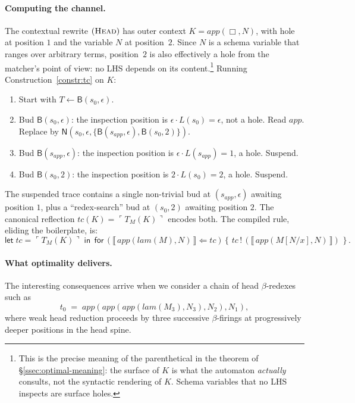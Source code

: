 \documentclass[11pt]{article}
\theoremstyle{plain}
\theoremstyle{definition}
\theoremstyle{remark}
\newcommand{\sem}[1]{\llbracket\,#1\,\rrbracket}
\newcommand{\reflect}[1]{\ulcorner #1 \urcorner}
\newcommand{\Send}[2]{#1 \,!\, (#2)}
\newcommand{\Recv}[3]{\mathsf{for}\,(#1 \Leftarrow #2)\,\{\,#3\,\}}
\newcommand{\Let}[3]{\mathsf{let}\;#1 = #2\;\mathsf{in}\;#3}
\begin{document}
\paragraph{Computing the channel.}
The contextual rewrite $(\textsc{Head})$ has outer context
$K = \mathit{app}(\Box, N)$, with hole at position $1$ and the variable
$N$ at position~$2$. Since $N$ is a schema variable that ranges over
arbitrary terms, position~$2$ is also effectively a hole from the
matcher's point of view: no LHS depends on its content.\footnote{This
is the precise meaning of the parenthetical in the theorem of
\S\ref{ssec:optimal-meaning}: the surface of $K$ is what the automaton
\emph{actually} consults, not the syntactic rendering of $K$. Schema
variables that no LHS inspects are surface holes.}
Running Construction~\ref{constr:tc} on $K$:
\begin{enumerate}[leftmargin=2em,label=\arabic*.]
  \item Start with $T \gets \mathsf{B}(s_{0}, \epsilon)$.
  \item Bud $\mathsf{B}(s_{0}, \epsilon)$: the inspection position is
        $\epsilon \cdot L(s_{0}) = \epsilon$, not a hole. Read
        $\mathit{app}$. Replace by
        $\mathsf{N}(s_{0}, \epsilon, \{\mathsf{B}(s_{\mathit{app}},
        \epsilon), \mathsf{B}(s_{0}, 2)\})$.
  \item Bud $\mathsf{B}(s_{\mathit{app}}, \epsilon)$: the inspection
        position is $\epsilon \cdot L(s_{\mathit{app}}) = 1$, a hole.
        Suspend.
  \item Bud $\mathsf{B}(s_{0}, 2)$: the inspection position is $2 \cdot
        L(s_{0}) = 2$, a hole. Suspend.
\end{enumerate}
The suspended trace contains a single non-trivial bud at
$(s_{\mathit{app}}, \epsilon)$ awaiting position $1$, plus a
``redex-search'' bud at $(s_{0}, 2)$ awaiting position $2$. The
canonical reflection $tc(K) = \reflect{T_{M}(K)}$ encodes both. The
compiled rule, eliding the boilerplate, is:
\[
  \Let{tc}{\reflect{T_{M}(K)}}{\,
    \Recv{\sem{\mathit{app}(\mathit{lam}(M), N)}}{tc}{\,
      \Send{tc}{\sem{\mathit{app}(M[N/x], N)}}\,}
  \,}.
\]

\paragraph{What optimality delivers.}
The interesting consequences arrive when we consider a chain of head
$\beta$-redexes such as
\[
  t_{0} \;=\; \mathit{app}(\mathit{app}(\mathit{app}(\mathit{lam}(M_{3}),
              N_{3}), N_{2}), N_{1}),
\]
where weak head reduction proceeds by three successive $\beta$-firings
at progressively deeper positions in the head spine.
\end{document}
